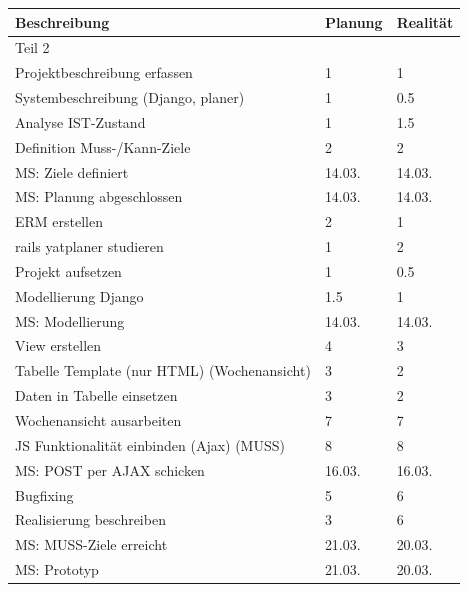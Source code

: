 \begin{table}[!ht]
\begin{center}      
     \begin{tabular}{lll}\\
        \toprule Beschreibung & Planung & Realität \\
        \midrule Teil 2 & & \\
        \midrule Projektbeschreibung erfassen  & 1 & 1\\
        \midrule Systembeschreibung (Django, planer) & 1 & 0.5\\
        \midrule Analyse IST-Zustand & 1 & 1.5\\
        \midrule Definition Muss-/Kann-Ziele & 2 & 2\\
        \midrule MS: Ziele definiert & 14.03. & 14.03. \\
        \midrule MS: Planung abgeschlossen & 14.03. & 14.03. \\
        \midrule ERM erstellen & 2 & 1\\
        \midrule rails yatplaner studieren & 1 & 2\\
        \midrule Projekt aufsetzen & 1 & 0.5\\
        \midrule Modellierung Django & 1.5 & 1\\
        \midrule MS: Modellierung & 14.03. & 14.03.\\
        \midrule View erstellen & 4 & 3\\
        \midrule Tabelle Template (nur HTML) (Wochenansicht) & 3 & 2\\
        \midrule Daten in Tabelle einsetzen & 3 & 2\\
        \midrule Wochenansicht ausarbeiten & 7 & 7\\
        \midrule JS Funktionalität einbinden (Ajax) (MUSS) & 8 & 8\\
        \midrule MS: POST per AJAX schicken & 16.03. & 16.03.\\
        \midrule Bugfixing & 5 & 6\\
        \midrule Realisierung beschreiben & 3 & 6\\
        \midrule MS: MUSS-Ziele erreicht & 21.03. & 20.03.\\
        \midrule MS: Prototyp & 21.03. & 20.03.\\
     \end{tabular}
\end{center}
\end{table}
\clearpage

